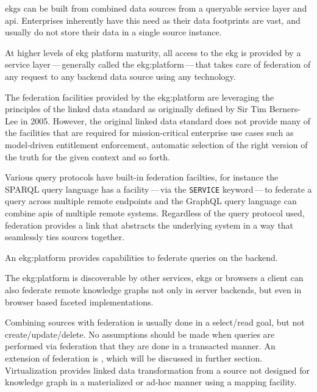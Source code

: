 %
%
\Glspl{ekg} can be built from combined data sources from a queryable service layer and \gls{api}.
Enterprises inherently have this need as their data footprints are vast,
and usually do not store their data in a single source instance.

At higher levels of \gls{ekg} platform maturity, all access to the \gls{ekg} is provided by a service layer\,---\,generally
called the \gls{ekg:platform}\,---\,that takes care of federation of any request to any backend data source using any technology.

The federation facilities provided by the \gls{ekg:platform} are leveraging the principles of the linked data standard\cite{linked-data}
as originally defined by Sir Tim Berners-Lee in 2005.
However, the original linked data standard does not provide many of the facilities that are required for mission-critical
enterprise use cases such as model-driven entitlement enforcement, automatic selection of the right version of the truth
for the given context and so forth.

Various query protocols have built-in federation facilties, for instance the SPARQL query language has a
facility\,---\,via the \lstinline|SERVICE| keyword\,---\,to federate a query across multiple remote endpoints and
the GraphQL query language can combine \glspl{api} of multiple remote systems.
Regardless of the query protocol used, federation provides a link that abstracts the underlying system in a
way that seamlessly ties sources together.

An \gls{ekg:platform} provides capabilities to federate queries on the backend.

The \gls{ekg:platform} is discoverable by other services, \glspl{ekg} or browsers
a client can also federate remote knowledge graphs not only in server backends,
but even in browser based faceted implementations.

Combining sources with federation is usually done in a select/read goal, but not create/update/delete.
No assumptions should be made when queries are performed via federation that they are done in a transacted manner.
An extension of federation is , which will be discussed in further section.
Virtualization provides linked data transformation from a source not designed for knowledge graph
in a materialized or ad-hoc manner using a mapping facility.